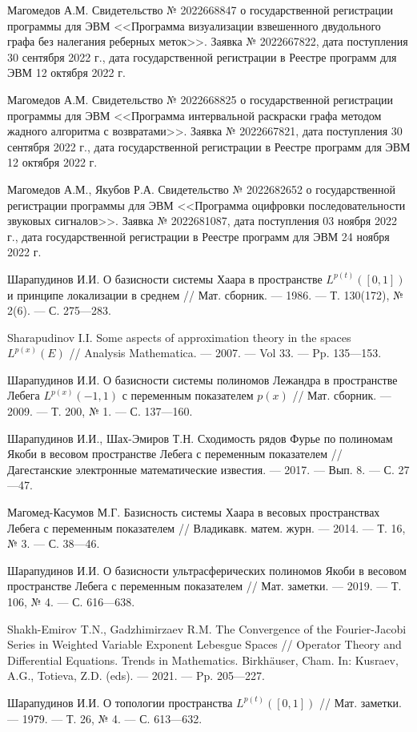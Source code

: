 \begin{thebibliography}{111}
Магомедов А.М.
Свидетельство № 2022668847 о государственной регистрации программы для ЭВМ <<Программа визуализации взвешенного двудольного графа без налегания реберных меток>>. Заявка № 2022667822, дата поступления 30 сентября 2022 г., дата государственной регистрации в Реестре программ для ЭВМ 12 октября 2022 г.

Магомедов А.М.
Свидетельство № 2022668825 о государственной регистрации программы для ЭВМ <<Программа интервальной раскраски графа методом жадного алгоритма с возвратами>>.
Заявка № 2022667821, дата поступления 30 сентября 2022 г., дата государственной регистрации в Реестре программ для ЭВМ 12 октября 2022 г.

Магомедов А.М., Якубов Р.А.
Свидетельство № 2022682652 о государственной регистрации программы для ЭВМ <<Программа оцифровки последовательности звуковых сигналов>>.
Заявка № 2022681087, дата поступления 03 ноября 2022 г., дата государственной регистрации в Реестре программ для ЭВМ 24 ноября 2022 г.



Шарапудинов И.И.
О базисности системы Хаара в пространстве $L^{p(t)}([0,1])$ и принципе локализации в среднем
//
Мат. сборник.
--- 1986.
--- Т. 130(172), № 2(6).
--- С. 275---283.

Sharapudinov I.I. Some aspects of approximation theory in the spaces $L^{p(x)}(E)$
//
Analysis Mathematica.
--- 2007.
--- Vol 33.
--- Pp. 135---153.

Шарапудинов И.И. О базисности системы полиномов Лежандра в пространстве Лебега $L^{p(x)}(-1,1)$ с переменным показателем $p(x)$
//
Мат. сборник.
--- 2009.
--- Т. 200, № 1.
--- С. 137---160.

Шарапудинов И.И., Шах-Эмиров Т.Н.
Сходимость рядов Фурье по полиномам Якоби в весовом пространстве Лебега с переменным показателем
//
Дагестанские электронные математические известия.
--- 2017.
--- Вып. 8.
--- С. 27---47.

Магомед-Касумов М.Г.
Базисность системы Хаара в весовых пространствах Лебега с переменным показателем
//
Владикавк. матем. журн.
--- 2014.
--- Т. 16, № 3.
--- С. 38---46.

Шарапудинов И.И.
О базисности ультрасферических полиномов Якоби в весовом пространстве Лебега с переменным показателем
//
Мат. заметки.
--- 2019.
--- Т. 106, № 4.
--- С. 616---638.

Shakh-Emirov T.N., Gadzhimirzaev R.M.
The Convergence of the Fourier-Jacobi Series in Weighted Variable Exponent Lebesgue Spaces
//
Operator Theory and Differential Equations. Trends in Mathematics. Birkhäuser, Cham.  In: Kusraev, A.G., Totieva, Z.D. (eds).
--- 2021.
--- Pp. 205---227.

Шарапудинов И.И.
О топологии пространства $L^{p(t)}([0,1])$
//
Мат. заметки.
--- 1979.
--- Т. 26, № 4.
--- С. 613---632.

\end{thebibliography} 